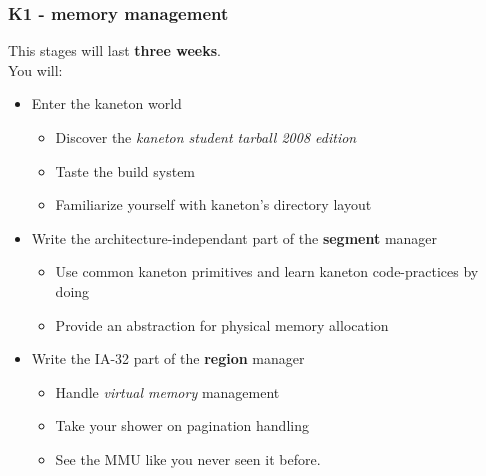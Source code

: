 






\begin{frame}
  \frametitle{K1 - memory management}

  This stages will last \textbf{three weeks}. \\

  You will:
  \begin{itemize}
  \item Enter the kaneton world
    \begin{itemize}
    \item Discover the \textit{kaneton student tarball 2008 edition}
    \item Taste the build system
    \item Familiarize yourself with kaneton's directory layout
    \end{itemize}

  \item Write the architecture-independant part of the \textbf{segment} manager
    \begin{itemize}
    \item Use common kaneton primitives and learn kaneton code-practices by doing
    \item Provide an abstraction for physical memory allocation
    \end{itemize}
  \item Write the IA-32 part of the \textbf{region} manager
    \begin{itemize}
    \item Handle \textit{virtual memory} management
    \item Take your shower on pagination handling
    \item See the MMU like you never seen it before.
    \end{itemize}
  \end{itemize}

\end{frame}

